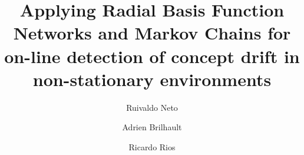 \documentclass[preprint,12pt]{elsarticle}
\begin{document}
\begin{frontmatter}


\title{Applying Radial Basis Function Networks and Markov Chains for on-line detection of concept drift in non-stationary environments}




\author{Ruivaldo Neto}
\author{Adrien Brilhault}
\author{Ricardo Rios}

\address{Salvador, Brazil}


\end{frontmatter}
\end{document}
